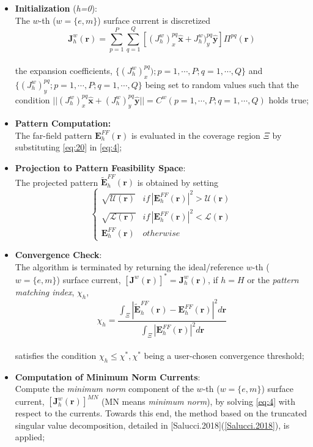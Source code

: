 \begin{itemize}
\item \textbf{Initialization} (\emph{h=0}):\\
The $w$-th ($w=\{ e,m\}$) surface current is discretized\begin{equation}
\mathbf{J}_{h}^{w}(\mathbf{r})=\sum_{p=1}^{P}\sum_{q=1}^{Q}[(J_{h}^{w})_{x}^{pq}\mathbf{\hat{x}}+J_{h}^{w})_{y}^{pq}\mathbf{\hat{y}}]\Pi^{pq}(\mathbf{r})\label{eq:20}\end{equation}
\\
the expansion coefficients, $\{(J_{h}^{w})_{x}^{pq});p=1,\cdots,P;q=1,\cdots,Q\}$
and $\{(J_{h}^{w})_{y}^{pq};p=1,\cdots,P;q=1,\cdots,Q\}$ being set
to random values such that the condition $||(J_{h}^{w})_{x}^{pq}\mathbf{\hat{x}}+(J_{h}^{w})_{y}^{pq}\mathbf{\hat{y}}||=C^{w}(p=1,\cdots,P;q=1,\cdots,Q)$
holds true;
\item \textbf{Pattern Computation:}\\
The far-field pattern $\mathbf{E}_{h}^{FF}(\mathbf{r})$ is evaluated
in the coverage region $\Xi$ by substituting \ref{eq:20} in \ref{eq:4};
\item \textbf{Projection to Pattern Feasibility Space}:\\
The projected pattern $\mathbf{\tilde{E}}_{h}^{FF}(\mathbf{r})$ is
obtained by setting \begin{equation}
\left\{ \begin{array}{cc}
\sqrt{\mathcal{U}(\mathbf{r})} & if\,|\mathbf{E}_{h}^{FF}(\mathbf{r})|^{2}>\mathcal{U}(\mathbf{r})\\
\sqrt{\mathcal{L}(\mathbf{r})} & if\,|\mathbf{E}_{h}^{FF}(\mathbf{r})|^{2}<\mathcal{L}(\mathbf{r})\\
\mathbf{\mathbf{E}}_{h}^{FF}(\mathbf{r}) & otherwise\end{array}\right.\label{eq:21}\end{equation}

\item \textbf{Convergence Check}:\\
The algorithm is terminated by returning the ideal/reference $w$-th
($w=\{ e,m\}$) surface current, $[\mathbf{J}^{w}(\mathbf{r})]^{*}=\mathbf{J}_{h}^{w}(\mathbf{r})$,
if $h=H$ or the \emph{pattern matching index}, $\chi_{h}$,\begin{equation}
\chi_{h}=\frac{\int_{\Xi}|\mathbf{\tilde{E}}_{h}^{FF}(\mathbf{r})-\mathbf{E}_{h}^{FF}(\mathbf{r})|^{2}d\mathbf{r}}{\int_{\Xi}|\mathbf{E}_{h}^{FF}(\mathbf{r})|^{2}d\mathbf{r}}\label{eq:22}\end{equation}
\\
satisfies the condition $\chi_{h}\leq\chi^{*},\chi^{*}$ being a user-chosen
convergence threshold;
\item \textbf{Computation of Minimum Norm Currents}:\\
Compute the \emph{minimum norm} component of the $w$-th ($w=\{ e,m\}$)
surface current, $[\mathbf{J}_{h}^{w}(\mathbf{r})]^{MN}$ (MN means
\emph{minimum norm}), by solving \ref{eq:4} with respect to the currents.
Towards this end, the method based on the truncated singular value
decomposition, detailed in {[}Salucci.2018{]}(\ref{Salucci.2018}),
is applied;
\end{itemize}
